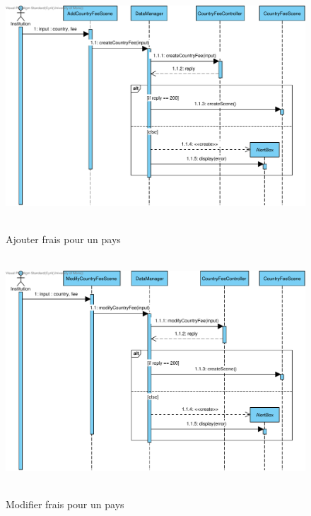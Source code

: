 \documentclass[]{report}
\begin{document}
\begin{figure}[h!]
	\hbox{
		\centering\includegraphics[width=\linewidth]{img/Sequence 4 - Extension 2.pdf}
	}
	\caption{Ajouter frais pour un pays}
	\end{figure}
	
\newpage

\begin{figure}[h!]
	\hbox{
		\centering\includegraphics[width=\linewidth]{img/Sequence 5 - Extension 2.pdf}
	}
	\caption{Modifier frais pour un pays}
	\end{figure}
	
\newpage
\end{document}
